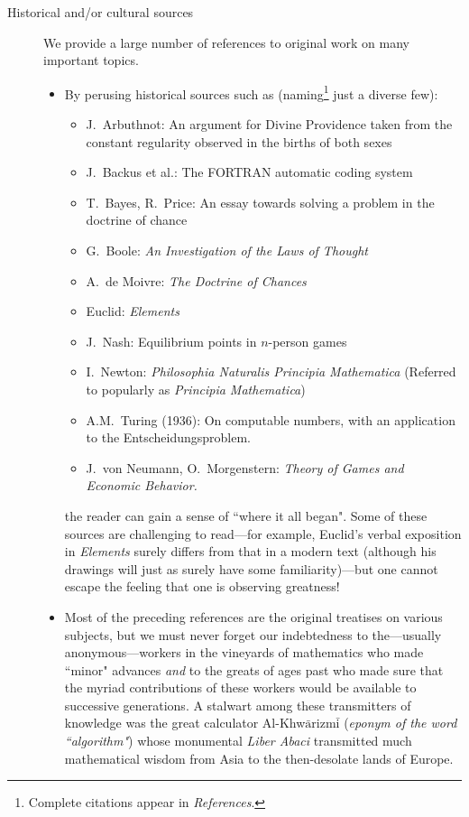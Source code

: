\begin{description}
\item[{\sc Historical and/or cultural sources}]
We provide a large number of references to original work on many important topics. 
  \begin{itemize}
  \item
By perusing historical sources such as (naming\footnote{Complete citations appear in {\it References}.} just a diverse few): 
     \begin{itemize}
     \item
J.~Arbuthnot: An argument for Divine Providence taken from the constant regularity observed in the births of both sexes
     \item
J.~Backus et al.: The FORTRAN automatic coding system
      \item
T.~Bayes, R.~Price: An essay towards solving a problem in the doctrine of chance
      \item
G.~Boole: {\it An Investigation of the Laws of Thought}   
     \item
A.~de Moivre: {\it The Doctrine of Chances}
     \item
Euclid: {\it Elements} 
    \item
J.~Nash: Equilibrium points in $n$-person games
    \item
I.~Newton: {\it Philosophia Naturalis Principia Mathematica}
(Referred to popularly as {\it Principia Mathematica})
    \item
A.M.~Turing (1936): On computable numbers, with an application to the Entscheidungsproblem.
    \item
J.~von Neumann, O.~Morgenstern: {\it Theory of Games and Economic Behavior.}
    \end{itemize}
the reader can gain a sense of ``where it all began".  Some of these sources are challenging to read---for example, Euclid's verbal exposition in {\it Elements} surely differs from that in a modern text (although his drawings will just as surely have some familiarity)---but one cannot escape the feeling that one is observing greatness!

\item
Most of the preceding references are the original treatises on various subjects, but we must never forget our indebtedness to the---usually anonymous---workers in the vineyards of mathematics who 
made ``minor" advances {\em and} to the greats of ages past who made sure that the myriad contributions of these workers would be available to successive generations.  A stalwart among these transmitters of knowledge was the great calculator Al-Khw$\bar{\mbox{a}}$rizm$\bar{\mbox{i}}$ ({\em eponym of the word ``algorithm"}) whose monumental {\it Liber Abaci} transmitted much mathematical wisdom from Asia to the then-desolate lands of Europe.


\end{itemize}
\end{description}
